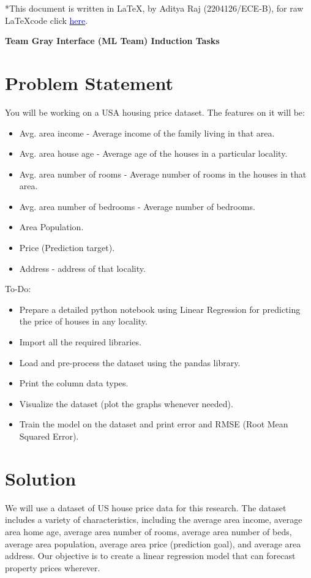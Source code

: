 \documentclass{article}
\begin{document}
*This document is written in \LaTeX, by Aditya Raj (2204126/ECE-B), for raw \LaTeX code click \href{https://github.com/hexronuspi/Latex-hackslash-Gray/blob/main/main.tex}{\textcolor{blue}{here}}.
\begin{center}
\textbf{\Large Team Gray Interface (ML Team) Induction Tasks}
\end{center}
\section{Problem Statement}

You will be working on a USA housing price dataset. The features on it will be:

\begin{itemize}
\item Avg. area income - Average income of the family living in that area.
\item Avg. area house age - Average age of the houses in a particular locality.
\item Avg. area number of rooms - Average number of rooms in the houses in that area.
\item Avg. area number of bedrooms - Average number of bedrooms.
\item Area Population.
\item Price (Prediction target).
\item Address - address of that locality.
\end{itemize}
To-Do:
\begin{itemize}
\item Prepare a detailed python notebook using Linear Regression for predicting the price of houses in any locality.
\item Import all the required libraries.
\item Load and pre-process the dataset using the pandas library.
\item Print the column data types.
\item Visualize the dataset (plot the graphs whenever needed).
\item Train the model on the dataset and print error and RMSE (Root Mean Squared Error).
\end{itemize}
\vspace{12\baselineskip}
\section{Solution}
We will use a dataset of US house price data for this research. The dataset includes a variety of characteristics, including the average area income, average area home age, average area number of rooms, average area number of beds, average area population, average area price (prediction goal), and average area address. Our objective is to create a linear regression model that can forecast property prices wherever.
\end{document}
